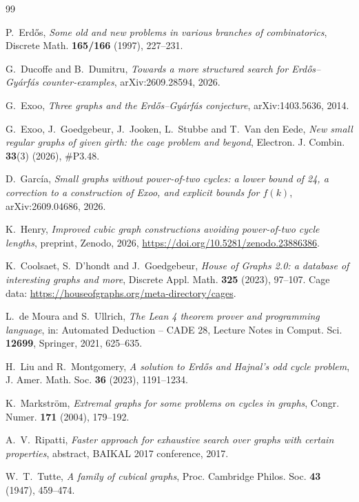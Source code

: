 \documentclass[11pt]{amsart}
\theoremstyle{definition}
\theoremstyle{remark}
\begin{document}
\begin{thebibliography}{99}

P.~Erdős, \emph{Some old and new problems in various branches of combinatorics},
Discrete Math. \textbf{165/166} (1997), 227--231.

G.~Ducoffe and B.~Dumitru, \emph{Towards a more structured search for
Erdős--Gyárfás counter-examples}, arXiv:2609.28594, 2026.

G.~Exoo, \emph{Three graphs and the Erdős--Gyárfás conjecture},
arXiv:1403.5636, 2014.

G.~Exoo, J.~Goedgebeur, J.~Jooken, L.~Stubbe and T.~Van den Eede,
\emph{New small regular graphs of given girth: the cage problem and beyond},
Electron. J. Combin. \textbf{33}(3) (2026), \#P3.48.

D.~García, \emph{Small graphs without power-of-two cycles: a lower bound of 24,
a correction to a construction of Exoo, and explicit bounds for $f(k)$},
arXiv:2609.04686, 2026.

K.~Henry, \emph{Improved cubic graph constructions avoiding power-of-two cycle
lengths}, preprint, Zenodo, 2026, \url{https://doi.org/10.5281/zenodo.23886386}.

K.~Coolsaet, S.~D'hondt and J.~Goedgebeur, \emph{House of Graphs 2.0: a
database of interesting graphs and more}, Discrete Appl. Math. \textbf{325}
(2023), 97--107. Cage data: \url{https://houseofgraphs.org/meta-directory/cages}.

L.~de Moura and S.~Ullrich, \emph{The Lean 4 theorem prover and programming
language}, in: Automated Deduction -- CADE 28, Lecture Notes in Comput. Sci.
\textbf{12699}, Springer, 2021, 625--635.

H.~Liu and R.~Montgomery, \emph{A solution to Erdős and Hajnal's odd cycle
problem}, J. Amer. Math. Soc. \textbf{36} (2023), 1191--1234.

K.~Markström, \emph{Extremal graphs for some problems on cycles in graphs},
Congr. Numer. \textbf{171} (2004), 179--192.

A.~V.~Ripatti, \emph{Faster approach for exhaustive search over graphs with
certain properties}, abstract, BAIKAL 2017 conference, 2017.

W.~T.~Tutte, \emph{A family of cubical graphs}, Proc. Cambridge Philos. Soc.
\textbf{43} (1947), 459--474.

\end{thebibliography}
\end{document}
